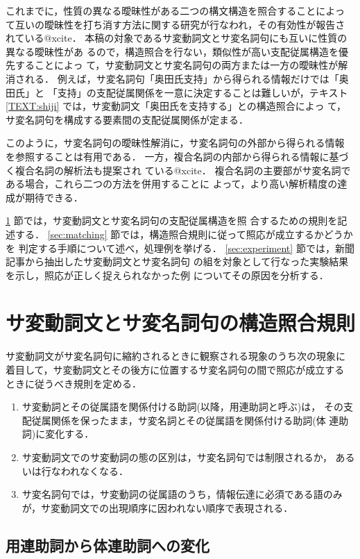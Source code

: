 これまでに，性質の異なる曖昧性がある二つの構文構造を照合することによっ
て互いの曖昧性を打ち消す方法に関する研究が行なわれ，その有効性が報告さ
れている@xcite．
本稿の対象であるサ変動詞文とサ変名詞句にも互いに性質の異なる曖昧性があ
るので，構造照合を行ない，類似性が高い支配従属構造を優先することによっ
て，サ変動詞文とサ変名詞句の両方または一方の曖昧性が解消される．
例えば，サ変名詞句「奥田氏支持」から得られる情報だけでは「奥田氏」と
「支持」の支配従属関係を一意に決定することは難しいが，テキスト
\ref{TEXT:shiji} では，サ変動詞文「奥田氏を支持する」との構造照合によっ
て，サ変名詞句を構成する要素間の支配従属関係が定まる．

このように，サ変名詞句の曖昧性解消に，サ変名詞句の外部から得られる情報
を参照することは有用である．
一方，複合名詞の内部から得られる情報に基づく複合名詞の解析法も提案され
ている@xcite．
複合名詞の主要部がサ変名詞である場合，これら二つの方法を併用することに
よって，より高い解析精度の達成が期待できる．

\ref{sec:depredrules} 節では，サ変動詞文とサ変名詞句の支配従属構造を照
合するための規則を記述する．
\ref{sec:matching} 節では，構造照合規則に従って照応が成立するかどうかを
判定する手順について述べ，処理例を挙げる．
\ref{sec:experiment} 節では，新聞記事から抽出したサ変動詞文とサ変名詞句
の組を対象として行なった実験結果を示し，照応が正しく捉えられなかった例
についてその原因を分析する．

\section{サ変動詞文とサ変名詞句の構造照合規則}
\label{sec:depredrules}

サ変動詞文がサ変名詞句に縮約されるときに観察される現象のうち次の現象に
着目して，サ変動詞文とその後方に位置するサ変名詞句の間で照応が成立する
ときに従うべき規則を定める．
\begin{enumerate}
\item  サ変動詞とその従属語を関係付ける助詞(以降，用連助詞と呼ぶ)は，
その支配従属関係を保ったまま，サ変名詞とその従属語を関係付ける助詞(体
連助詞)に変化する．
\item サ変動詞文でのサ変動詞の態の区別は，サ変名詞句では制限されるか，
あるいは行なわれなくなる．
\item サ変名詞句では，サ変動詞の従属語のうち，情報伝達に必須である語のみ
が，サ変動詞文での出現順序に因われない順序で表現される．
\end{enumerate}

\subsection{用連助詞から体連助詞への変化}

